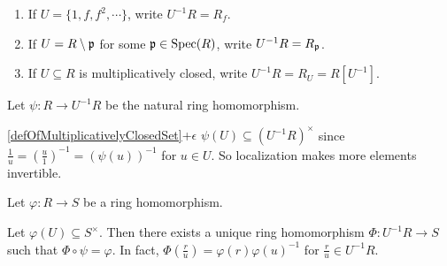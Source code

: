 \begin{notation}
    \begin{enumerate}
        \item If $U = \{1,f,f^2,\cdots\}$, write $U^{-1}R = R_f$.
        \item If $U = R \setminus \mathfrak{p}$ for some $\mathfrak{p} \in \operatorname{Spec}(R)$, write $U^{-1}R = R_{\mathfrak{p}}$.
        \item If $U \subseteq R$ is multiplicatively closed, write $U^{-1}R = R_U = R[U^{-1}]$.
    \end{enumerate}
\end{notation}

\noindent Let $\psi: R \to U^{-1}R$ be the natural ring homomorphism.

\begin{customrecall}{\ref{defOfMultiplicativelyClosedSet}+$\epsilon$}
    $\psi(U) \subseteq (U^{-1}R)^{\times}$ since $\frac{1}{u} = (\frac{u}{1})^{-1} = (\psi(u))^{-1}$ for $u \in U$. So localization makes more elements invertible.
\end{customrecall}

\noindent Let $\varphi: R \to S$ be a ring homomorphism. 

\begin{proposition}
    Let $\varphi(U) \subseteq S^{\times}$. Then there exists a unique ring homomorphism $\Phi:U^{-1}R \to S$ such that $\Phi \circ \psi = \varphi$. In fact, $\Phi(\frac{r}{u}) = \varphi(r)\varphi(u)^{-1}$ for $\frac{r}{u} \in U^{-1}R$.
    \begin{center}
        \ \ \ \ \ \ \ \ \ \ \ \
    \end{center}
\end{proposition}

